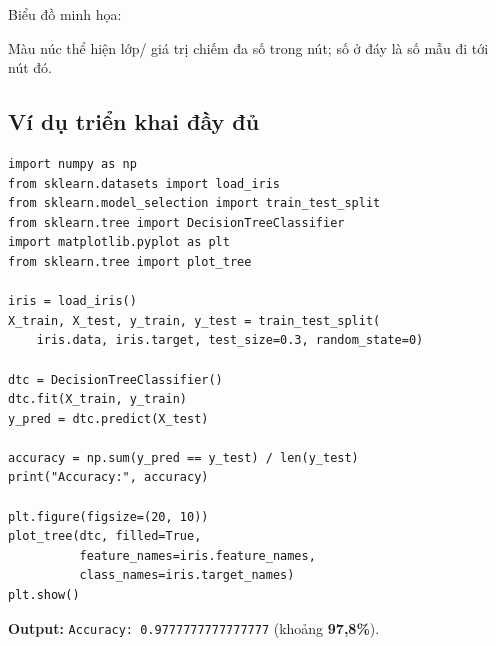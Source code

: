 \begin{ynghia}[title={Biểu đồ cây quyết định}]
Biểu đồ minh họa:


Màu núc thể hiện lớp/ giá trị chiếm đa số trong nút; số ở đáy là số mẫu đi tới nút đó.
\end{ynghia}

\subsection{Ví dụ triển khai đầy đủ}

\begin{vidu}[title={Mã hoàn chỉnh}]
\begin{lstlisting}
import numpy as np
from sklearn.datasets import load_iris
from sklearn.model_selection import train_test_split
from sklearn.tree import DecisionTreeClassifier
import matplotlib.pyplot as plt
from sklearn.tree import plot_tree

iris = load_iris()
X_train, X_test, y_train, y_test = train_test_split(
    iris.data, iris.target, test_size=0.3, random_state=0)

dtc = DecisionTreeClassifier()
dtc.fit(X_train, y_train)
y_pred = dtc.predict(X_test)

accuracy = np.sum(y_pred == y_test) / len(y_test)
print("Accuracy:", accuracy)

plt.figure(figsize=(20, 10))
plot_tree(dtc, filled=True,
          feature_names=iris.feature_names,
          class_names=iris.target_names)
plt.show()
\end{lstlisting}

\textbf{Output:} \texttt{Accuracy: 0.9777777777777777} (khoảng \textbf{97,8\%}).
\end{vidu}

